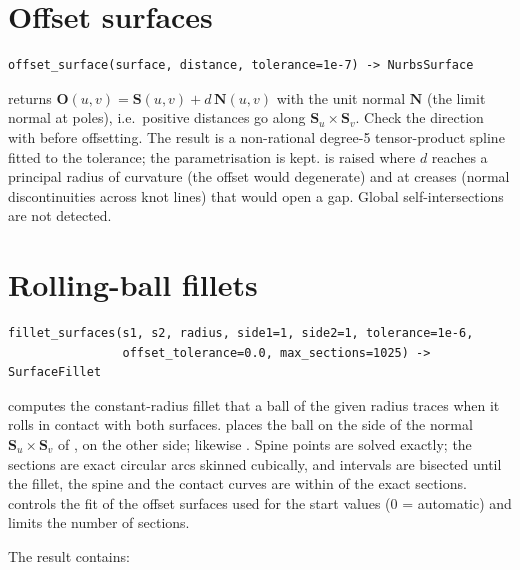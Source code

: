\section{Offset surfaces}\label{sec:offset-surface}

\begin{lstlisting}[style=text]
offset_surface(surface, distance, tolerance=1e-7) -> NurbsSurface
\end{lstlisting}

 returns $\mathbf O(u,v) = \mathbf S(u,v) + d\,\mathbf N(u,v)$ with the
unit normal $\mathbf N$ (the limit normal at poles), i.e.\ positive distances go along
$\mathbf S_u\times\mathbf S_v$. Check the direction with  before
offsetting. The result is a non-rational degree-5 tensor-product spline fitted to the tolerance;
the parametrisation is kept.  is raised where $d$ reaches a principal radius
of curvature (the offset would degenerate) and at creases (normal discontinuities across knot
lines) that would open a gap. Global self-intersections are not detected.

\section{Rolling-ball fillets}\label{sec:surface-fillet}

\begin{lstlisting}[style=text]
fillet_surfaces(s1, s2, radius, side1=1, side2=1, tolerance=1e-6,
                offset_tolerance=0.0, max_sections=1025) -> SurfaceFillet
\end{lstlisting}

 computes the constant-radius fillet that a ball of the given radius
traces when it rolls in contact with both surfaces.  places the ball on the side
of the normal $\mathbf S_u\times\mathbf S_v$ of ,  on the other side; likewise
. Spine points are solved exactly; the sections are exact circular arcs skinned
cubically, and intervals are bisected until the fillet, the spine and the contact curves are
within  of the exact sections.  controls the fit of the
offset surfaces used for the start values (0 = automatic) and  limits the
number of sections.

The result  contains:

